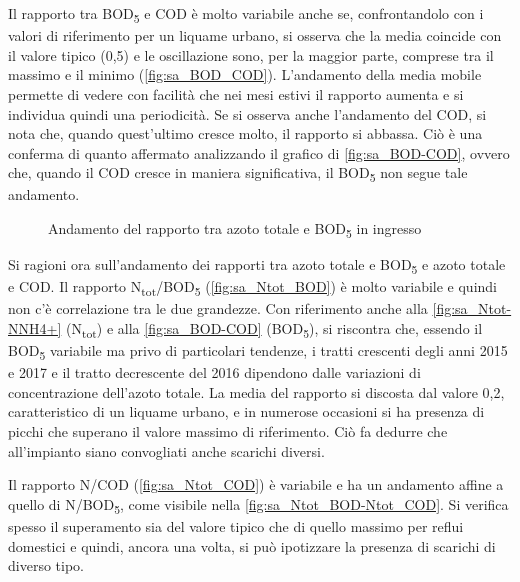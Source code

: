 Il rapporto tra BOD\textsubscript{5} e COD è molto variabile anche se, confrontandolo con i valori di riferimento per un liquame urbano, si osserva che la media coincide con il valore tipico (0,5) e le oscillazione sono, per la maggior parte, comprese tra il massimo e il minimo (\autoref{fig:sa_BOD_COD}).
L’andamento della media mobile permette di vedere con facilità che nei mesi estivi il rapporto aumenta e si individua quindi una periodicità. 
Se si osserva anche l’andamento del COD, si nota che, quando quest’ultimo cresce molto, il rapporto si abbassa. Ciò è una conferma di quanto affermato analizzando il grafico di \autoref{fig:sa_BOD-COD}, ovvero che, quando il COD cresce in maniera significativa, il BOD\textsubscript{5} non segue tale andamento.

\begin{figure}[H]
	\centering
	\caption{Andamento del rapporto tra azoto totale e BOD\textsubscript{5} in ingresso}
	\label{fig:sa_Ntot_BOD}
\end{figure}

Si ragioni ora sull’andamento dei rapporti tra azoto totale e BOD\textsubscript{5} e azoto totale e COD.
Il rapporto N\textsubscript{tot}/BOD\textsubscript{5} (\autoref{fig:sa_Ntot_BOD}) è molto variabile e quindi non c’è correlazione tra le due grandezze. 
Con riferimento anche alla \autoref{fig:sa_Ntot-NNH4+} (N\textsubscript{tot}) e alla \autoref{fig:sa_BOD-COD} (BOD\textsubscript{5}), si riscontra che, essendo il BOD\textsubscript{5} variabile ma privo di particolari tendenze, i tratti crescenti degli anni 2015 e 2017 e il tratto decrescente del 2016 dipendono dalle variazioni di concentrazione dell’azoto totale.
La media del rapporto si discosta dal valore 0,2, caratteristico di un liquame urbano, e in numerose occasioni si ha presenza di picchi che superano il valore massimo di riferimento. Ciò fa dedurre che all’impianto siano convogliati anche scarichi diversi.

Il rapporto N/COD (\autoref{fig:sa_Ntot_COD}) è variabile e ha un andamento affine a quello di N/BOD\textsubscript{5}, come visibile nella \autoref{fig:sa_Ntot_BOD-Ntot_COD}. Si verifica spesso il superamento sia del valore tipico che di quello massimo per reflui domestici e quindi, ancora una volta, si può ipotizzare la presenza di scarichi di diverso tipo.

